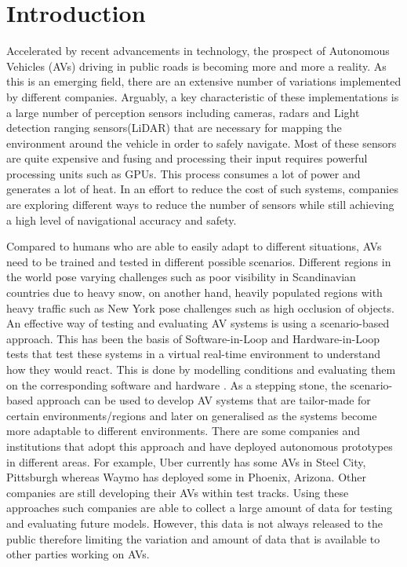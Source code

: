 %
%
\let\textcircled=\pgftextcircled
\chapter{Introduction}
\label{chap:intro}

Accelerated by recent advancements in technology, the prospect of Autonomous Vehicles (AVs) driving in public roads is becoming more and more a reality. As this is an emerging field, there are an extensive number of variations implemented by different companies. Arguably, a key characteristic of these implementations is a large number of perception sensors including cameras, radars and Light detection ranging sensors(LiDAR) that are necessary for mapping the environment around the vehicle in order to safely navigate. Most of these sensors are quite expensive and fusing and processing their input requires powerful processing units such as GPUs. This process consumes a lot of power and generates a lot of heat. In an effort to reduce the cost of such systems, companies are exploring different ways to reduce the number of sensors while still achieving a high level of navigational accuracy and safety. 

Compared to humans who are able to easily adapt to different situations, AVs need to be trained and tested in different possible scenarios. Different regions in the world pose varying challenges such as poor visibility in Scandinavian countries due to heavy snow, on another hand, heavily populated regions with heavy traffic such as New York pose challenges such as high occlusion of objects. An effective way of testing and evaluating AV systems is using a scenario-based approach. This has been the basis of Software-in-Loop and Hardware-in-Loop tests that test these systems in a virtual real-time environment to understand how they would react. This is done by modelling conditions and evaluating them on the corresponding software and hardware \cite{winkle2016development}. As a stepping stone, the scenario-based approach can be used to develop AV systems that are tailor-made for certain environments/regions and later on generalised as the systems become more adaptable to different environments. There are some companies and institutions that adopt this approach and have deployed autonomous prototypes in different areas. For example, Uber currently has some AVs in Steel City, Pittsburgh whereas Waymo has deployed some in Phoenix, Arizona. Other companies are still developing their AVs within test tracks\cite{miller_2018}. Using these approaches such companies are able to collect a large amount of data for testing and evaluating future models. However, this data is not always released to the public therefore limiting the variation and amount of data that is available to other parties working on AVs. 

